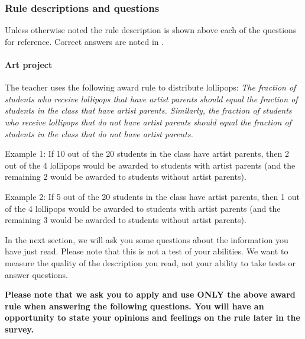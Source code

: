 \documentclass{article}
\newcommand{\correct}[1]{{\color{red}{#1}}}
\newcommand{\correct}[1]{{\color{red}{#1}}}
\begin{document}
\subsubsection{Rule descriptions and questions}\label{app:rules}
Unless otherwise noted the rule description is shown above each of the questions for reference. Correct answers are noted in \correct{red}.

\paragraph{Art project}
The teacher uses the following award rule to distribute lollipops: \emph{The fraction of students who receive lollipops that have artist parents should equal the fraction of students in the class that have artist parents. Similarly, the fraction of students who receive lollipops that do not have artist parents should equal the fraction of students in the class that do not have artist parents.}

Example 1: If 10 out of the 20 students in the class have artist parents, then 2 out of the 4 lollipops would be awarded to students with artist parents (and the remaining 2 would be awarded to students without artist parents).

Example 2: If 5 out of the 20 students in the class have artist parents, then 1 out of the 4 lollipops would be awarded to students with artist parents (and the remaining 3 would be awarded to students without artist parents).

In the next section, we will ask you some questions about the information you have just read. Please note that this is not a test of your abilities. We want to measure the quality of the description you read, not your ability to take tests or answer questions.

\textbf{Please note that we ask you to apply and use ONLY the above award rule when answering the following questions. You will have an opportunity to state your opinions and feelings on the rule later in the survey.}
\end{document}
